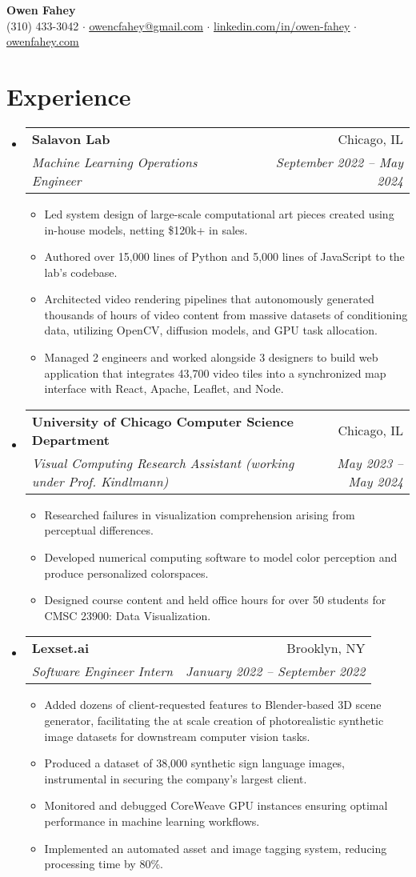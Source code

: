 \documentclass[letterpaper,11pt]{article}
\makeatletter
\newcommand{\resumeItem}[1]{
  \item\small{
    {#1 \vspace{-2pt}}
  }
}
\newcommand{\resumeSubheading}[4]{
  \vspace{-2pt}\item
    \begin{tabular*}{0.97\textwidth}[t]{l@{\extracolsep{\fill}}r}
      \textbf{#1} & #2 \\
      \textit{\small#3} & \textit{\small #4} \\
    \end{tabular*}\vspace{-7pt}
}
\newcommand{\resumeSubHeadingListStart}{\begin{itemize}[leftmargin=0.125in, label={}]}
\newcommand{\resumeSubHeadingListEnd}{\end{itemize}}
\newcommand{\resumeItemListStart}{\begin{itemize}[leftmargin=0.185in]
}
\newcommand{\resumeItemListEnd}{\end{itemize}\vspace{-5pt}}
\makeatother
\begin{document}
\begin{center}
  \textbf{\Huge 
Owen Fahey} \\
  \small (310) 433-3042 $\cdot$
  \href{mailto:owenfahey@uchicago.edu}{\underline{owencfahey@gmail.com}} $\cdot$
  \href{https://www.linkedin.com/in/owen-fahey}{\underline{linkedin.com/in/owen-fahey}} $\cdot$
  \href{https://owenfahey.com}{\underline{owenfahey.com}}
\end{center}

  
\section{Experience}
  \resumeSubHeadingListStart
    \resumeSubheading
      {Salavon Lab}
      {Chicago, IL}
      {Machine Learning Operations Engineer}
      {September 2022 -- May 2024}
      \resumeItemListStart
        \resumeItem{Led system design of large-scale computational art pieces created using in-house models, netting \$120k+ in sales.}
        \resumeItem{Authored over 15,000 lines of Python and 5,000 lines of JavaScript to the lab's codebase.}
        \resumeItem{Architected video rendering pipelines that autonomously generated thousands of hours of video content from massive datasets of conditioning data, utilizing OpenCV, diffusion models, and GPU task allocation.}
        \resumeItem{Managed 2 engineers and worked alongside 3 designers to build web application that integrates 43,700 video tiles into a synchronized map interface with React, Apache, Leaflet, and Node.}
        
      \resumeItemListEnd
    \resumeSubheading
      {University of Chicago Computer Science Department}
      {Chicago, IL}
      {Visual Computing Research Assistant (working under Prof. Kindlmann)}
      {May 2023 -- May 2024}
      \resumeItemListStart
        \resumeItem{Researched failures in visualization comprehension arising from perceptual differences.}
        \resumeItem{Developed numerical computing software to model color perception and produce personalized colorspaces.}
        \resumeItem{Designed course content and held office hours for over 50 students for CMSC 23900: Data Visualization.}
      \resumeItemListEnd
    \resumeSubheading
      {Lexset.ai}
      {Brooklyn, NY}
      {Software Engineer Intern}
      {January 2022 -- September 2022}
      \resumeItemListStart
        \resumeItem{Added dozens of client-requested features to Blender-based 3D scene generator, facilitating the at scale creation of \nolinebreak photorealistic synthetic image datasets for downstream computer vision tasks.} \nolinebreak
        \resumeItem{Produced a dataset of 38,000 synthetic sign language images, instrumental in securing the company's largest client.}
        \resumeItem{Monitored and debugged CoreWeave GPU instances ensuring optimal performance in machine learning workflows. }
        \resumeItem{Implemented an automated asset and image tagging system, reducing processing time by 80\%.}
      \resumeItemListEnd
  \resumeSubHeadingListEnd
\end{document}
